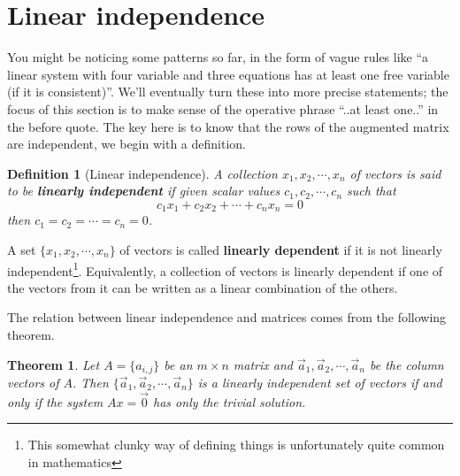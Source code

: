 \documentclass[12pt]{article}
\numberwithin{equation}{subsection}
\numberwithin{figure}{subsection}
\newtheorem{thm}[subsection]{Theorem}
\newtheorem{defn}[subsection]{Definition}
\theoremstyle{note}
\begin{document}
\section{Linear independence}



You might be noticing some patterns so far, in the form of vague rules like ``a linear system with four variable and three equations has at least one free variable (if it is consistent)''. We'll eventually turn these into more precise statements; the focus of this section is to make sense of the operative phrase ``..at least one..'' in the before quote. The key here is to know that the rows of the augmented matrix are independent, we begin with a definition.

\begin{defn}[Linear independence]
	A collection $x_1,x_2,\cdots, x_n$ of vectors is said to be \textbf{linearly independent} if given scalar values $c_1,c_2, \cdots,c_n$ such that \[ c_1 x_1+ c_2 x_2 + \cdots + c_nx_n=0\] then $c_1=c_2=\cdots=c_n=0$. 
\end{defn}

A set $\{x_1,x_2,\cdots, x_n\}$ of vectors is called \textbf{linearly dependent} if it is not linearly independent\footnote{This somewhat clunky way of defining things is unfortunately quite common in mathematics}. Equivalently, a collection of vectors is linearly dependent if one of the vectors from it can be written as a linear combination of the others.

The relation between linear independence and matrices comes from the following theorem.

\begin{thm} \label{thm-lin-indep-null}
	Let $A=\{a_{i,j}\}$ be an $m\times n$ matrix and $\vec{a}_1, \vec{a}_2, \cdots, \vec{a}_n$ be the column vectors of $A$. Then $\{\vec{a}_1, \vec{a}_2, \cdots, \vec{a}_n\}$ is a linearly independent set of vectors if and only if the system $Ax=\vec{0}$ has only the trivial solution. 
\end{thm}
\end{document}
